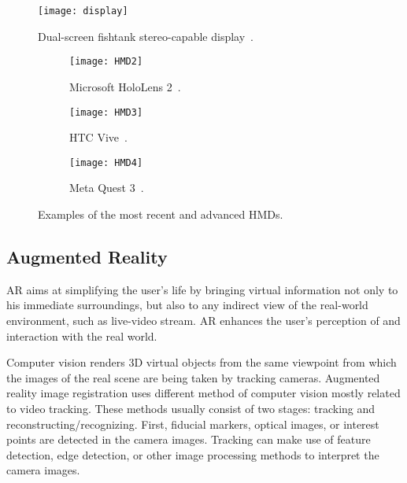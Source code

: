 \begin{figure}[h!]
    \centering
    \texttt{[image: display]}
    \caption{Dual-screen fishtank stereo-capable display~\cite{SHERMAN2019258}.} 
    \label{fig:display}
\end{figure}

\begin{figure}[h!]
    \centering
    \begin{subfigure}[b]{0.3\textwidth}
        \centering
        \texttt{[image: HMD2]}
        \caption{Microsoft HoloLens 2~\cite{headset_article}.}
        \label{fig:HM}
    \end{subfigure}
    \begin{subfigure}[b]{0.3\textwidth}
        \centering
        \texttt{[image: HMD3]}
        \caption{HTC Vive~\cite{SHERMAN2019258}.}
        \label{fig:y1}
    \end{subfigure}
    \hfill
    \begin{subfigure}[b]{0.3\textwidth}
        \centering
        \texttt{[image: HMD4]}
        \caption{Meta Quest 3~\cite{article}.}
        \label{fig:y2}
    \end{subfigure}
    \caption{Examples of the most recent and advanced \glspl{HMD}.}
    \label{fig:HMDs}
\end{figure}

\FloatBarrier

\subsection{Augmented Reality}
\label{sec:augmented_reality}

\gls{AR} aims at simplifying the user’s life by bringing virtual information not
only to his immediate surroundings, but also to any indirect view of the real-world
environment, such as live-video stream. \gls{AR} enhances the user’s perception of and
interaction with the real world. 

Computer vision renders \gls{3D} virtual objects from the same viewpoint from which the
images of the real scene are being taken by tracking cameras. Augmented reality image
registration uses different method of computer vision mostly related to video tracking.
These methods usually consist of two stages: tracking and reconstructing/recognizing. First,
fiducial markers, optical images, or interest points are detected in the camera images.
Tracking can make use of feature detection, edge detection, or other image processing
methods to interpret the camera images.

